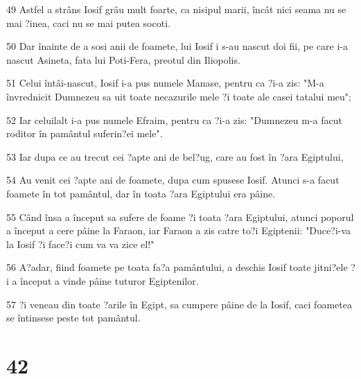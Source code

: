 \par 49 Astfel a strâns Iosif grâu mult foarte, ca nisipul marii, încât nici seama nu se mai ?inea, caci nu se mai putea socoti.
\par 50 Dar înainte de a sosi anii de foamete, lui Iosif i s-au nascut doi fii, pe care i-a nascut Asineta, fata lui Poti-Fera, preotul din Iliopolis.
\par 51 Celui întâi-nascut, Iosif i-a pus numele Manase, pentru ca ?i-a zis: "M-a învrednicit Dumnezeu sa uit toate necazurile mele ?i toate ale casei tatalui meu";
\par 52 Iar celuilalt i-a pus numele Efraim, pentru ca ?i-a zis: "Dumnezeu m-a facut roditor în pamântul suferin?ei mele".
\par 53 Iar dupa ce au trecut cei ?apte ani de bel?ug, care au fost în ?ara Egiptului,
\par 54 Au venit cei ?apte ani de foamete, dupa cum spusese Iosif. Atunci s-a facut foamete în tot pamântul, dar în toata ?ara Egiptului era pâine.
\par 55 Când însa a început sa sufere de foame ?i toata ?ara Egiptului, atunci poporul a început a cere pâine la Faraon, iar Faraon a zis catre to?i Egiptenii: "Duce?i-va la Iosif ?i face?i cum va va zice el!"
\par 56 A?adar, fiind foamete pe toata fa?a pamântului, a deschis Iosif toate jitni?ele ?i a început a vinde pâine tuturor Egiptenilor.
\par 57 ?i veneau din toate ?arile în Egipt, sa cumpere pâine de la Iosif, caci foametea se întinsese peste tot pamântul.

\chapter{42}

